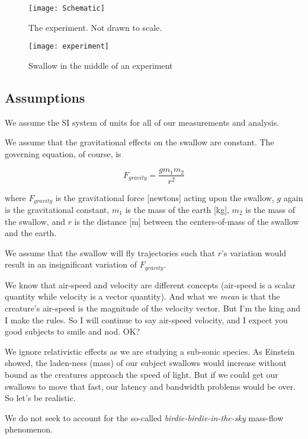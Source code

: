 \begin{figure}[h]
\centering
\texttt{[image: Schematic]}
\caption{The experiment. Not drawn to scale.}
\label{fig:schematic}
\end{figure}


\begin{figure}[h]
\centering
\texttt{[image: experiment]}
\caption{Swallow in the middle of an experiment}
\label{fig:experiment}
\end{figure}

\subsection{Assumptions}

\begin{tightitem}
\item We assume the SI system of units for all of our measurements and analysis.

\item We assume that the gravitational effects on the swallow are constant.  The governing equation, of course, is

\begin{equation}
\label{eqn:weight}
F_{gravity} = \frac{g m_{1} m_{2}}{r^2}
\end{equation}

where $F_{gravity}$ is the gravitational force [newtons] acting upon the swallow, $g$ again is the gravitational constant, $m_{1}$ is the mass of the earth [kg], $m_{2}$ is the mass of the swallow, and $r$ is the distance [m] between the centers-of-mass of the swallow and the earth.

\item We assume that the swallow will fly trajectories such that $r$'s variation would result in an insignificant variation of $F_{gravity}$.

\item We know that air-speed and velocity are different concepts (air-speed is a scalar quantity while velocity is a vector quantity).  And what we \emph{mean} is that the creature's air-speed is the magnitude of the velocity vector.  But I'm the king and I make the rules.  So I will continue to say air-speed velocity, and I expect you good subjects to smile and nod. OK?

\item We ignore relativistic effects as we are studying a sub-sonic species.  As Einstein showed, the laden-ness (mass) of our subject swallows would increase without bound as the creatures approach the speed of light.  But if we could get our swallows to move that fast, our latency and bandwidth problems would be over.  So let's be realistic.

\item We do not seek to account for the so-called \emph{birdie-birdie-in-the-sky} mass-flow phenomenon.
\end{tightitem}
